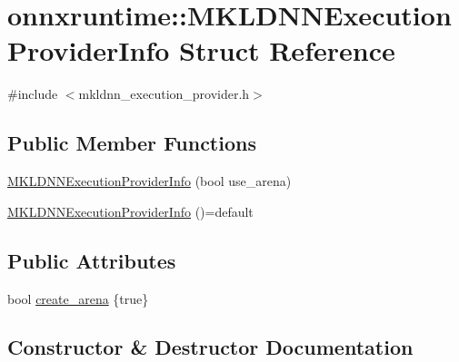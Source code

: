 \hypertarget{structonnxruntime_1_1MKLDNNExecutionProviderInfo}{}\section{onnxruntime\+:\+:M\+K\+L\+D\+N\+N\+Execution\+Provider\+Info Struct Reference}
\label{structonnxruntime_1_1MKLDNNExecutionProviderInfo}


{\ttfamily \#include $<$mkldnn\+\_\+execution\+\_\+provider.\+h$>$}

\subsection*{Public Member Functions}
\begin{DoxyCompactItemize}
\item 
\mbox{\hyperlink{structonnxruntime_1_1MKLDNNExecutionProviderInfo_a26caa33dfbc7454d05a7252ce4196ab4}{M\+K\+L\+D\+N\+N\+Execution\+Provider\+Info}} (bool use\+\_\+arena)
\item 
\mbox{\hyperlink{structonnxruntime_1_1MKLDNNExecutionProviderInfo_aa2bb22f7d43fea555d898ac149be52db}{M\+K\+L\+D\+N\+N\+Execution\+Provider\+Info}} ()=default
\end{DoxyCompactItemize}
\subsection*{Public Attributes}
\begin{DoxyCompactItemize}
\item 
bool \mbox{\hyperlink{structonnxruntime_1_1MKLDNNExecutionProviderInfo_a5efa8e5d422152101d70a73ca579c698}{create\+\_\+arena}} \{true\}
\end{DoxyCompactItemize}


\subsection{Constructor \& Destructor Documentation}
\mbox{\label{structonnxruntime_1_1MKLDNNExecutionProviderInfo_a26caa33dfbc7454d05a7252ce4196ab4}} 
